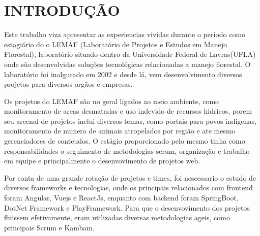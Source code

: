 \chapter{INTRODUÇÃO}

Este trabalho viza apresentar as experiencias vividas durante o periodo como estagiário do o LEMAF (Laboratório de Projetos e Estudos
em Manejo Florestal), laboratório situado dentro da Universidade Federal de Lavras(UFLA) onde são desenvolvidas soluções tecnológicas relacionadas a manejo florestal.
O laboratório foi inalgurado em 2002 e desde lá, vem desenvolvimento diversos projetos para diversos orgãos e empresas.

Os projetos do LEMAF são no geral ligados ao meio ambiente, como monitoramento de areas desmatadas e uso indevido de recursos hidricos, porem seu arcenal de projetos inclui diversos temas, como portais para povos indigenas, monitoramento de numero de animais atropelados por região e ate mesmo gerenciadores de conteudos.   
O estágio proporcionado pelo mesmo tinha como responsabilidades o seguimento de metodologias scrum, organização e trabalho em equipe e principalmente o desenvovimento de projetos web.

Por conta de uma grande rotação de projetos e times, foi nescessario o estudo de diversos frameworks e tecnologias, onde os principais relacionados com frontend foram Angular, Vuejs e ReactJs, enquanto com backend foram SpringBoot, DotNet Framework e PlayFramework.
Para que o desenvovimento dos projetos fluissem efetivamente, eram utilizadas diversas metodologias ageis, como principais Scrum e Kambam.